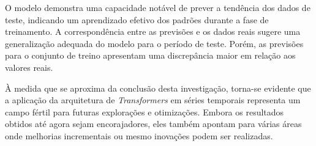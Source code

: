 O modelo demonstra uma capacidade notável de prever a tendência dos dados de teste, indicando um aprendizado efetivo dos padrões durante a fase de treinamento. A correspondência entre as previsões e os dados reais sugere uma generalização adequada do modelo para o período de teste. Porém, as previsões para o conjunto de treino apresentam uma discrepância maior em relação aos valores reais.

À medida que se aproxima da conclusão desta investigação, torna-se evidente que a aplicação da arquitetura de \textit{Transformers} em séries temporais representa um campo fértil para futuras explorações e otimizações. Embora os resultados obtidos até agora sejam encorajadores, eles também apontam para várias áreas onde melhorias incrementais ou mesmo inovações podem ser realizadas. 

\begin{comment}
A complexidade do modelo pode será experimentando com diferentes números de \textit{encoder layers}\footnote{\textit{Encoder Layers} são camadas em uma rede neural que são responsáveis por transformar a entrada em uma representação de espaço latente. Eles são comuns em arquiteturas como \textit{autoencoders} e \textit{Transformers}.} e tamanhos de \textit{attention heads}\footnote{\textit{Attention Heads} são múltiplas instâncias do mecanismo de atenção em um modelo \textit{Transformer}. Eles permitem que o modelo se concentre em diferentes partes da entrada simultaneamente, melhorando a capacidade do modelo de aprender dependências complexas.} . O objetivo é encontrar o ponto ideal entre \textit{underfitting}\footnote{\textit{Underfitting} ocorre quando um modelo de aprendizado de máquina é muito simples para capturar a estrutura subjacente dos dados. Isso resulta em um desempenho ruim tanto no conjunto de treinamento quanto no conjunto de testes. \textit{Underfitting} é frequentemente o resultado de um modelo excessivamente simplista ou de um treinamento inadequado.} e \textit{overfitting}. O uso de \textit{cross-validation}\footnote{\textit{Cross-validation} é uma técnica estatística usada para avaliar a habilidade de um modelo em generalizar para um conjunto de dados independente. Envolve dividir o conjunto de dados original em um conjunto de treinamento e um conjunto de testes. O modelo é treinado no conjunto de treinamento e testado no conjunto de testes, e esse processo é repetido várias vezes com diferentes divisões dos dados. Isso ajuda a fornecer uma estimativa mais robusta do desempenho do modelo.} oferece uma avaliação mais robusta do modelo. Este método irá ajudar a garantir que o modelo se generalize bem para dados não vistos.
\end{comment}